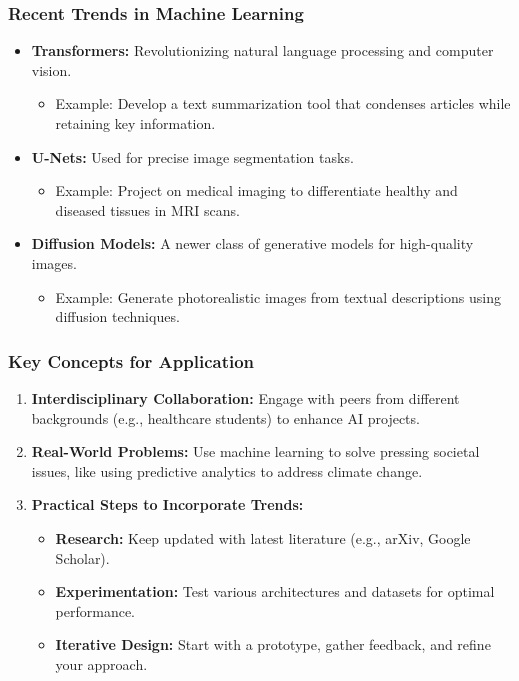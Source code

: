 \documentclass[aspectratio=169]{beamer}
\begin{document}
\begin{frame}[fragile]
    \frametitle{Recent Trends in Machine Learning}
    \begin{itemize}
        \item \textbf{Transformers:} Revolutionizing natural language processing and computer vision.
        \begin{itemize}
            \item Example: Develop a text summarization tool that condenses articles while retaining key information.
        \end{itemize}
        
        \item \textbf{U-Nets:} Used for precise image segmentation tasks.
        \begin{itemize}
            \item Example: Project on medical imaging to differentiate healthy and diseased tissues in MRI scans.
        \end{itemize}
        
        \item \textbf{Diffusion Models:} A newer class of generative models for high-quality images.
        \begin{itemize}
            \item Example: Generate photorealistic images from textual descriptions using diffusion techniques.
        \end{itemize}
    \end{itemize}
\end{frame}

\begin{frame}[fragile]
    \frametitle{Key Concepts for Application}
    \begin{enumerate}
        \item \textbf{Interdisciplinary Collaboration:} Engage with peers from different backgrounds (e.g., healthcare students) to enhance AI projects.
        
        \item \textbf{Real-World Problems:} Use machine learning to solve pressing societal issues, like using predictive analytics to address climate change.
        
        \item \textbf{Practical Steps to Incorporate Trends:}
        \begin{itemize}
            \item \textbf{Research:} Keep updated with latest literature (e.g., arXiv, Google Scholar).
            \item \textbf{Experimentation:} Test various architectures and datasets for optimal performance.
            \item \textbf{Iterative Design:} Start with a prototype, gather feedback, and refine your approach.
        \end{itemize}
    \end{enumerate}
\end{frame}
\end{document}
